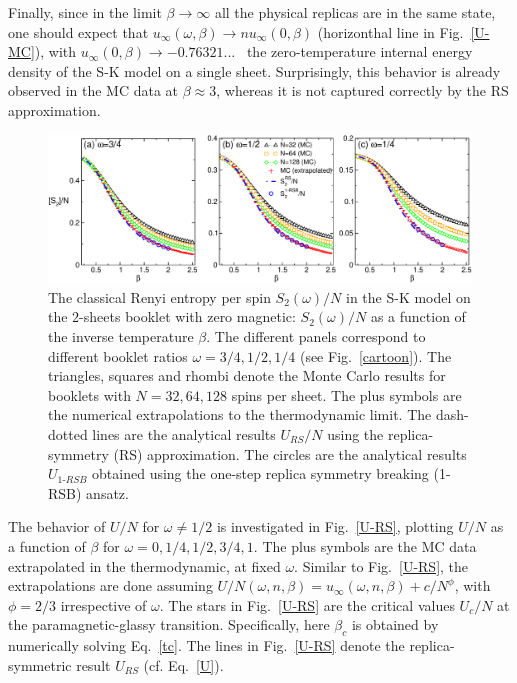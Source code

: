 \documentclass[twocolumn,superscriptaddress,prb,10pt]{revtex4-1}
\begin{document}
Finally, since in the limit $\beta\to\infty$ all the physical replicas are in the same state, 
one should expect that $u_\infty(\omega,\beta)\to n u_\infty(0,\beta)$ (horizonthal line in 
Fig.~\ref{U-MC}), with $u_{\infty}(0,\beta)\to-0.76321...$~\cite{parisi-1979,parisi-1983} the 
zero-temperature internal energy density of the S-K model on a single sheet. Surprisingly, 
this behavior is already observed in the MC data at $\beta\approx 3$, whereas it is not 
captured correctly by the RS approximation.

\begin{figure}[t]
\includegraphics*[width=0.93\linewidth]{./draft_figs/Renyi_MC_v2}
\caption{ The classical Renyi entropy per spin $S_2(\omega)/N$  in the 
 S-K model on the $2$-sheets booklet with zero magnetic: $S_2(\omega)/N$ as a 
 function of the inverse temperature $\beta$. The different panels 
 correspond to different booklet ratios $\omega=3/4,1/2,1/4$ (see Fig.~\ref{cartoon}). 
 The triangles, squares and rhombi denote the Monte Carlo results for 
 booklets with $N=32,64,128$ spins per sheet. The plus symbols are the numerical 
 extrapolations to the thermodynamic limit. The dash-dotted lines are the  
 analytical results $U_{RS}/N$ using the replica-symmetry (RS) approximation. 
 The circles are the analytical results $U_{1\textrm{-}RSB}$ obtained 
 using the one-step replica symmetry breaking (1-RSB) ansatz.
}
\label{Renyi-MC}
\end{figure}

The behavior of $U/N$ for $\omega\ne1/2$ is investigated in Fig.~\ref{U-RS},
plotting $U/N$ as a function of $\beta$ for $\omega=0,1/4,1/2,3/4,1$. The plus symbols 
are the MC data extrapolated in the thermodynamic, at fixed $\omega$. Similar to Fig.~\ref{U-RS}, 
the extrapolations are done assuming $U/N(\omega,n,\beta)=u_{\infty}(\omega,n,\beta)+
c/N^{\phi}$, with $\phi=2/3$ irrespective of $\omega$. The stars in Fig.~\ref{U-RS} are 
the critical values $U_c/N$ at the paramagnetic-glassy transition. Specifically, here  
$\beta_c$ is obtained by numerically solving Eq.~\eqref{tc}. The lines in Fig.~\ref{U-RS} 
denote the replica-symmetric result $U_{RS}$ (cf. Eq.~\eqref{U}). 
\end{document}
